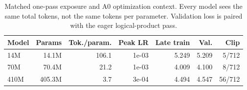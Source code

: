 \begin{table}[t]
\centering
\caption{Matched one-pass exposure and A0 optimization context. Every model sees the same total tokens, not the same tokens per parameter. Validation loss is paired with the eager logical-product pass.}
\label{tab:baseline-exposure}
\small
\begin{tabular}{lrrrrrr}
\toprule
Model & Params & Tok./param. & Peak LR & Late train & Val. & Clip \\
\midrule
14M & 14.1M & 106.1 & 1e-03 & 5.249 & 5.209 & 5/712 \\
70M & 70.4M & 21.2 & 1e-03 & 4.009 & 4.100 & 8/712 \\
410M & 405.3M & 3.7 & 3e-04 & 4.494 & 4.547 & 56/712 \\
\bottomrule
\end{tabular}
\end{table}
